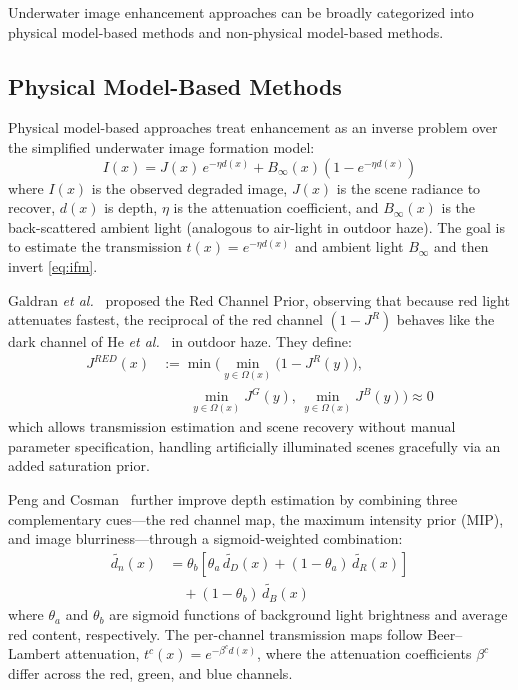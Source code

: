 \documentclass[10pt,twocolumn,letterpaper]{article}
\begin{document}
Underwater image enhancement approaches can be broadly categorized into
physical model-based methods and non-physical model-based methods.

\subsection{Physical Model-Based Methods}

Physical model-based approaches treat enhancement as an inverse problem over
the simplified underwater image formation model:
\begin{equation}
  I(x) = J(x)\,e^{-\eta d(x)} + B_\infty(x)\!\left(1 - e^{-\eta d(x)}\right)
  \label{eq:ifm}
\end{equation}
where $I(x)$ is the observed degraded image, $J(x)$ is the scene radiance
to recover, $d(x)$ is depth, $\eta$ is the attenuation coefficient, and
$B_\infty(x)$ is the back-scattered ambient light (analogous to air-light in
outdoor haze). The goal is to estimate the transmission $t(x) = e^{-\eta d(x)}$
and ambient light $B_\infty$ and then invert \cref{eq:ifm}.

Galdran \emph{et al.}~\cite{galdran2015automatic} proposed the Red Channel
Prior, observing that because red light attenuates fastest, the reciprocal
of the red channel $(1-J^R)$ behaves like the dark channel of He
\emph{et al.}~\cite{he2009dark} in outdoor haze. They define:
\begin{equation}
  \begin{aligned}
    J^{RED}(x) &:= \min\!\Biggl(\min_{y\in\Omega(x)}\bigl(1-J^R(y)\bigr), \\
    &\qquad \min_{y\in\Omega(x)} J^G(y), \, \min_{y\in\Omega(x)} J^B(y)\Biggr) \approx 0
  \end{aligned}
  \label{eq:redchannel}
\end{equation}
which allows transmission estimation and scene recovery without manual
parameter specification, handling artificially illuminated scenes gracefully
via an added saturation prior.

Peng and Cosman~\cite{peng2017underwater} further improve depth estimation
by combining three complementary cues---the red channel map, the maximum
intensity prior (MIP), and image blurriness---through a sigmoid-weighted
combination:
\begin{equation}
  \begin{aligned}
    \widetilde{d_n}(x) &= \theta_b\!\left[\theta_a\,\widetilde{d_D}(x)
    + (1-\theta_a)\,\widetilde{d_R}(x)\right] \\
    &\quad + (1-\theta_b)\,\widetilde{d_B}(x)
  \end{aligned}
  \label{eq:peng_depth}
\end{equation}
where $\theta_a$ and $\theta_b$ are sigmoid functions of background light
brightness and average red content, respectively. The per-channel
transmission maps follow Beer--Lambert attenuation,
$t^c(x) = e^{-\beta^c d(x)}$, where the attenuation coefficients $\beta^c$
differ across the red, green, and blue channels.
\end{document}
